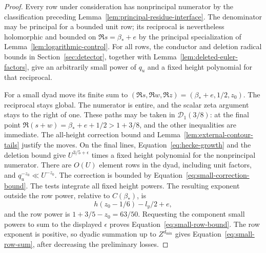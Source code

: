 \documentclass[11pt,a4paper]{article}
\numberwithin{equation}{section}
\numberwithin{figure}{section}
\theoremstyle{definition}
\theoremstyle{remark}
\begin{document}
\begin{proof}
Every row under consideration has nonprincipal numerator by the
classification preceding Lemma~\ref{lem:principal-residue-interface}.
The denominator may be principal for a bounded unit row; its reciprocal
is nevertheless holomorphic and bounded on $\Re s=\beta_*+e$ by the
principal specialization of Lemma~\ref{lem:logarithmic-control}.
For all rows, the conductor and deletion radical bounds in
Section~\ref{sec:detector}, together with
Lemma~\ref{lem:deleted-euler-factors}, give an arbitrarily small power of
$q_u$ and a fixed height polynomial for that reciprocal.

For a small dyad move its finite sum to
$(\Re s,\Re w,\Re z)=(\beta_*+e,1/2,z_0)$.
The reciprocal stays global.  The numerator is entire, and the scalar
zeta argument stays to the right of one.  These paths may be taken in
$\mathcal D_1(3/8)$: at the final point
$\Re(s+w)=\beta_*+e+1/2>1+3/8$, and the other inequalities are immediate.
The all-height correction bound and
Lemma~\ref{lem:external-contour-tails} justify the moves.  On the final
lines, Equation~\eqref{eq:hecke-growth} and the deletion bound give
$U^{3/5+\epsilon}$ times a fixed height polynomial for the nonprincipal
numerator.  There are $O(U)$ element rows in the dyad, including unit
factors, and $q_u^{-z_0}\ll U^{-z_0}$.  The correction is bounded by
Equation~\eqref{eq:small-correction-bound}.  The tests integrate all fixed
height powers.  The resulting exponent outside the row power, relative
to $C(\beta_*)$, is
\[
 h(z_0-1/6)-l_y/2+e,
\]
and the row power is $1+3/5-z_0=63/50$.  Requesting the component small
powers to sum to the displayed $\epsilon$ proves
Equation~\eqref{eq:small-row-bound}.  The row exponent is positive, so
dyadic summation up to $Z^{d_{\min}}$ gives
Equation~\eqref{eq:small-row-sum}, after decreasing the preliminary losses.


\end{proof}
\end{document}
